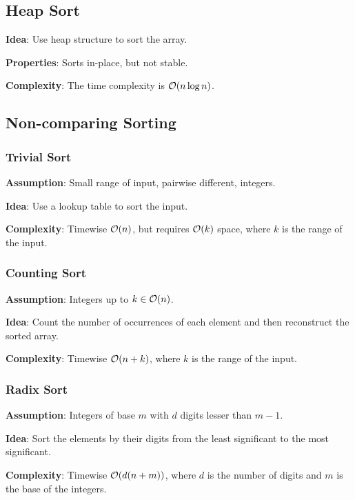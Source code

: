 \documentclass{article}
\begin{document}
\subsection{Heap Sort}
\textbf{Idea}: Use heap structure to sort the array.\par
\textbf{Properties}: Sorts in-place, but not stable.\par
\textbf{Complexity}: The time complexity is $\mathcal{O}(n\log n)$.\par


\subsection{Non-comparing Sorting}
\subsubsection{Trivial Sort}
\textbf{Assumption}: Small range of input, pairwise different, integers.\par
\textbf{Idea}: Use a lookup table to sort the input.\par
\textbf{Complexity}: Timewise $\mathcal{O}(n)$, but requires $\mathcal{O}(k)$ space, where $k$ is the range of the input.\par


\subsubsection{Counting Sort}
\textbf{Assumption}: Integers up to $k\in\mathcal{O}(n)$.\par
\textbf{Idea}: Count the number of occurrences of each element and then reconstruct the sorted array.\par
\textbf{Complexity}: Timewise $\mathcal{O}(n+k)$, where $k$ is the range of the input.\par


\subsubsection{Radix Sort}
\textbf{Assumption}: Integers of base $m$ with $d$ digits lesser than $m-1$.\par
\textbf{Idea}: Sort the elements by their digits from the least significant to the most significant.\par
\textbf{Complexity}: Timewise $\mathcal{O}(d(n+m))$, where $d$ is the number of digits and $m$ is the base of the integers.\par

\end{document}
